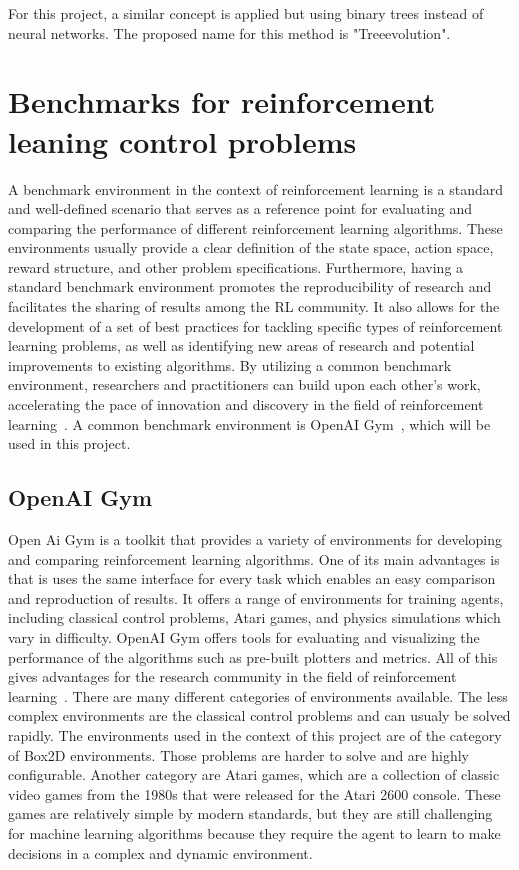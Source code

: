 For this project, a similar concept is applied but using binary trees instead of neural networks. The proposed name for this method is "Treeevolution".


\section{Benchmarks for reinforcement leaning control problems}

A benchmark environment in the context of reinforcement learning is a standard and well-defined scenario that serves as a reference point for evaluating and comparing the performance of different reinforcement learning algorithms. These environments usually provide a clear definition of the state space, action space, reward structure, and other problem specifications.
Furthermore, having a standard benchmark environment promotes the reproducibility of research and facilitates the sharing of results among the RL community. It also allows for the development of a set of best practices for tackling specific types of reinforcement learning problems, as well as identifying new areas of research and potential improvements to existing algorithms. By utilizing a common benchmark environment, researchers and practitioners can build upon each other's work, accelerating the pace of innovation and discovery in the field of reinforcement learning~\cite{sutton_reinforcement_2018}. A common benchmark environment is OpenAI Gym~\cite{brockman_openai_2016}, which will be used in this project.

\subsection{OpenAI Gym}

Open Ai Gym is a toolkit that provides a variety of environments for developing and comparing reinforcement learning algorithms. One of its main advantages is that is uses the same interface for every task which enables an easy comparison and reproduction of results. It offers a range of environments for training agents, including classical control problems, Atari games, and physics simulations which vary in difficulty. OpenAI Gym offers tools for evaluating and visualizing the performance of the algorithms such as pre-built plotters and metrics. All of this gives advantages for the research community in the field of reinforcement learning~\cite{noauthor_openai_nodate}. There are many different categories of environments available. The less complex environments are the classical control problems and can usualy be solved rapidly. The environments used in the context of this project are of the category of Box2D environments. Those problems are harder to solve and are highly configurable. Another category are Atari games, which are a collection of classic video games from the 1980s that were released for the Atari 2600 console. These games are relatively simple by modern standards, but they are still challenging for machine learning algorithms because they require the agent to learn to make decisions in a complex and dynamic environment.

